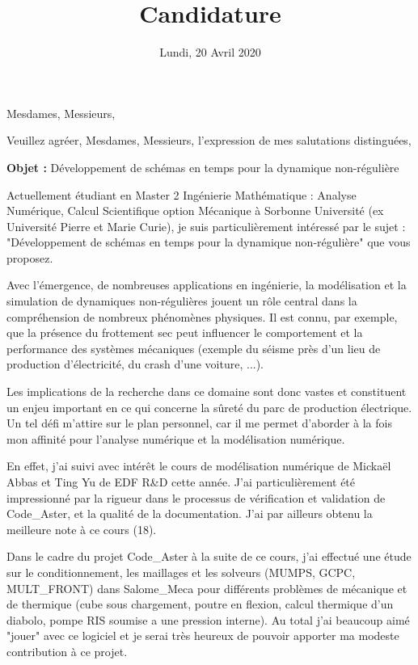 \documentclass[11pt,a4paper,sans]{moderncv}        %
\title{Candidature}                               %
\begin{document}
\date{Lundi, 20 Avril 2020}
\opening{Mesdames, Messieurs,}
\closing{Veuillez agréer, Mesdames, Messieurs, l’expression de mes salutations distinguées,}
\makelettertitle

\textbf{Objet :} Développement de schémas en temps pour la dynamique non-régulière



Actuellement étudiant en Master 2 Ingénierie Mathématique : Analyse Numérique, Calcul Scientifique option Mécanique à Sorbonne Université (ex Université Pierre et Marie Curie), je suis particulièrement intéressé par le sujet : "Développement de schémas en temps pour la dynamique non-régulière" que vous proposez.

Avec l'émergence, de nombreuses applications en ingénierie, la modélisation et la simulation de dynamiques non-régulières jouent un rôle central dans la compréhension de nombreux phénomènes physiques. Il est connu, par exemple, que la présence du frottement sec peut influencer le comportement et la performance des systèmes mécaniques (exemple du séisme près d'un lieu de production d'électricité, du crash d'une voiture, ...).

Les implications de la recherche dans ce domaine sont donc vastes et constituent un enjeu important en ce qui concerne la sûreté du parc de production électrique. Un tel défi m'attire sur le plan personnel, car il me permet d'aborder à la fois mon affinité pour l'analyse numérique et la modélisation numérique.

En effet, j'ai suivi avec intérêt le cours de modélisation numérique de Mickaël Abbas et Ting Yu de EDF R\&D cette année. J'ai particulièrement été impressionné par la rigueur dans le processus de vérification et validation de Code\_Aster, et la qualité de la documentation. J'ai par ailleurs obtenu la meilleure note à ce cours (18).

Dans le cadre du projet Code\_Aster à la suite de ce cours, j'ai effectué une étude sur le conditionnement, les maillages et les solveurs (MUMPS, GCPC, MULT\_FRONT) dans Salome\_Meca pour différents problèmes de mécanique et de thermique (cube sous chargement, poutre en flexion, calcul thermique d'un diabolo, pompe RIS soumise a une pression interne).
Au total j'ai beaucoup aimé "jouer" avec ce logiciel et je serai très heureux de pouvoir apporter ma modeste contribution à ce projet.
\end{document}
